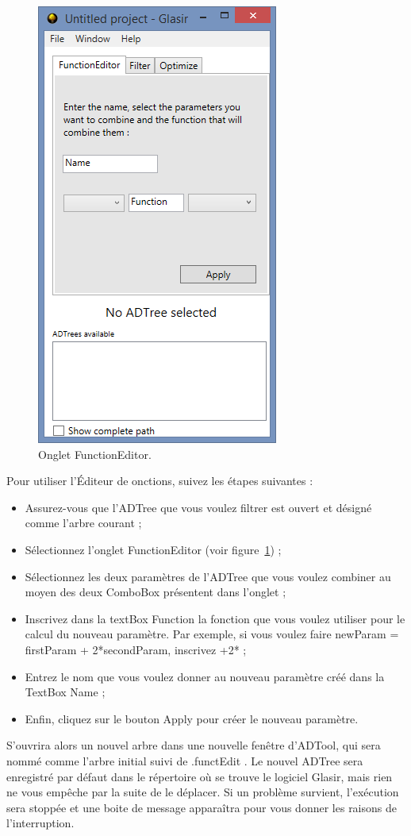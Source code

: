  \begin{figure}[H]
        \centering
        \includegraphics[height=0.7\textwidth]{figure/functionEdition.png}
        \caption{Onglet FunctionEditor.}
        \label{fig:functEdit}
    \end{figure}

Pour utiliser l'Éditeur de onctions, suivez les étapes suivantes : 

\begin{itemize}
\item Assurez-vous que l'ADTree que vous voulez filtrer est ouvert et désigné comme l'arbre courant ;
\item Sélectionnez l'onglet \og FunctionEditor \fg{} (voir {\sc figure}~\ref{fig:functEdit}) ;
\item Sélectionnez les deux paramètres de l'ADTree que vous voulez combiner au moyen des deux ComboBox présentent dans l'onglet ;
\item Inscrivez dans la textBox \og Function \fg{} la fonction que vous voulez utiliser pour le calcul du nouveau paramètre. Par exemple, si vous voulez faire \og newParam = firstParam + 2*secondParam\fg , inscrivez \og +2* \fg{} ;
\item Entrez le nom que vous voulez donner au nouveau paramètre créé dans la TextBox \og Name \fg{} ;
\item Enfin, cliquez sur le bouton \og Apply\fg{} pour créer le nouveau paramètre.
\end{itemize} 

S'ouvrira alors un nouvel arbre dans une nouvelle fenêtre d'ADTool, qui sera nommé comme l'arbre initial suivi de \og .functEdit \fg{} . Le nouvel ADTree sera enregistré par défaut dans le répertoire où se trouve le logiciel Glasir, mais rien ne vous empêche par la suite de le déplacer. 
Si un problème survient, l'exécution sera stoppée et une boite de message apparaîtra pour vous donner les raisons de l'interruption.

